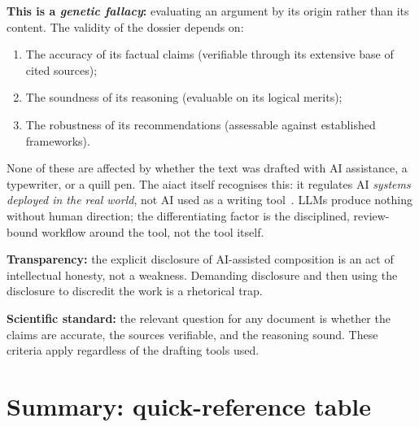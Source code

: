\begin{answerbox}[Answer to Q10.3]
\textbf{This is a \emph{genetic fallacy}:} evaluating an argument by its origin rather than its content. The validity of the dossier depends on:
\begin{enumerate}[nosep]
    \item The accuracy of its factual claims (verifiable through its extensive base of cited sources);
    \item The soundness of its reasoning (evaluable on its logical merits);
    \item The robustness of its recommendations (assessable against established frameworks).
\end{enumerate}

\noindent None of these are affected by whether the text was drafted with AI assistance, a typewriter, or a quill pen. The \gls{aiact} itself recognises this: it regulates AI \emph{systems deployed in the real world}, not AI used as a writing tool~\cite{eu-ai-act}. LLMs produce nothing without human direction; the differentiating factor is the disciplined, review-bound workflow around the tool, not the tool itself.

\medskip\noindent\textbf{Transparency:} the explicit disclosure of AI-assisted composition is an act of intellectual honesty, not a weakness. Demanding disclosure and then using the disclosure to discredit the work is a rhetorical trap.

\medskip\noindent\textbf{Scientific standard:} the relevant question for any document is whether the claims are accurate, the sources verifiable, and the reasoning sound. These criteria apply regardless of the drafting tools used.
\end{answerbox}

\section{Summary: quick-reference table}
\label{sec:summary}

